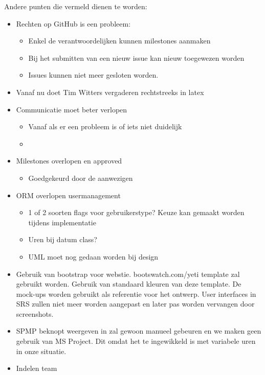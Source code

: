 Andere punten die vermeld dienen te worden:

\begin{itemize}
	\item
	{
		Rechten op GitHub is een probleem:
		\begin{itemize}
			\item Enkel de verantwoordelijken kunnen milestones aanmaken
			\item Bij het submitten van een nieuw issue kan nieuw toegewezen worden
			\item Issues kunnen niet meer gesloten worden.
		\end{itemize}	
	}
\end{itemize}

\begin{itemize}
	\item Vanaf nu doet Tim Witters vergaderen rechtstreeks in latex
	\item Communicatie moet beter verlopen 
		\begin{itemize}
			\item Vanaf als er een probleem is of iets niet duidelijk
			\item
		\end{itemize}
	\item Milestones overlopen en approved
		\begin{itemize}
			\item Goedgekeurd door de aanwezigen
		\end{itemize}
	\item ORM overlopen usermanagement
		\begin{itemize}
			\item 1 of 2 soorten flags voor gebruikerstype? Keuze kan gemaakt worden tijdens implementatie
			\item Uren bij datum class?
			\item UML moet nog gedaan worden bij design
		\end{itemize}
	\item Gebruik van bootstrap voor webstie. bootswatch.com/yeti template zal gebruikt worden. Gebruik van standaard kleuren van deze template. De mock-ups worden gebruikt als referentie voor het ontwerp. User interfaces in SRS zullen niet meer worden aangepast en later pas worden vervangen door screenshots.
	\item SPMP beknopt weergeven in zal gewoon manueel gebeuren en we maken geen gebruik van MS Project. Dit omdat het te ingewikkeld is met variabele uren in onze situatie.
	\item Indelen team
\end{itemize}



